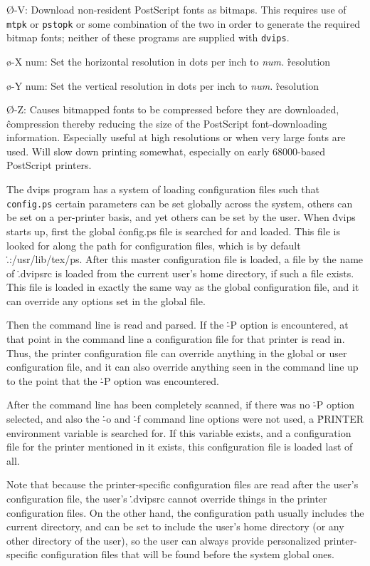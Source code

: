 {\O-V:
Download non-resident PostScript fonts as bitmaps.  This requires use
of {\tt mtpk} or {\tt pstopk} or some combination of the two in order
to generate the required bitmap fonts; neither of these programs are
supplied with {\tt dvips}.

\o-X num:
Set the horizontal resolution in dots per inch to {\it num.}
\^{resolution}

\o-Y num:
Set the vertical resolution in dots per inch to {\it num.}
\^{resolution}

\O-Z:
Causes bitmapped fonts to be compressed before they are downloaded,
\^{compression}
thereby reducing the size of the PostScript font-downloading information.
Especially useful at high resolutions or when very large fonts are
used.  Will slow down printing somewhat, especially on early 68000-based
PostScript printers.\par}


The \.{dvips} program has a system of loading configuration files such that
\^{{\tt config.ps}}
certain parameters can be set globally across the system, others can be set
on a
per-printer basis, and yet others can be set by the user.  When \.{dvips}
starts up, first the global \.{config.ps} file is searched for and loaded.
This file is looked for along the path for configuration files, which is by
default \.{.:/usr/lib/tex/ps}.
After this master configuration file is loaded, a file by the name of
\.{.dvipsrc} is loaded from the current user's home directory, if such
a file exists.  This file is loaded in exactly the same way as the global
configuration file, and it can override any options set in the global
file.

Then the command line is read and parsed.  If the \.{-P} option is
encountered, at that point in the command line a configuration file
for that printer is read in.  Thus, the printer configuration file can
override anything in the global or user configuration file, and it can
also override anything seen in the command line up to the point that the
\.{-P} option was encountered.

After the command line has been completely scanned, if there was no
\.{-P} option selected, and also the \.{-o} and \.{-f} command line
options were not used, a \.{PRINTER} environment variable is
searched for.  If this variable exists, and a configuration file for
the printer mentioned in it exists, this configuration file is
loaded last of all.

Note that because the printer-specific configuration files are read
after the user's configuration file, the user's \.{.dvipsrc}
cannot override things in
the printer configuration files.  On the other hand, the configuration path
usually includes the current directory, and can be set to include the
user's home directory (or any other directory of the user), so the user can
always provide personalized printer-specific configuration files that will
be found before the system global ones.

